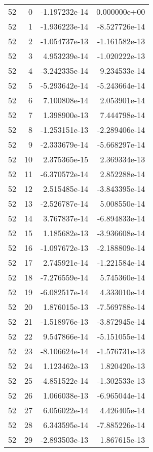 \begin{tabular}{rrrr}
  52 &    0 & -1.197232e-14 &  0.000000e+00 \\
  52 &    1 & -1.936223e-14 & -8.527726e-14 \\
  52 &    2 & -1.054737e-13 & -1.161582e-13 \\
  52 &    3 &  4.953239e-14 & -1.020222e-13 \\
  52 &    4 & -3.242335e-14 &  9.234533e-14 \\
  52 &    5 & -5.293642e-14 & -5.243664e-14 \\
  52 &    6 &  7.100808e-14 &  2.053901e-14 \\
  52 &    7 &  1.398900e-13 &  7.444798e-14 \\
  52 &    8 & -1.253151e-13 & -2.289406e-14 \\
  52 &    9 & -2.333679e-14 & -5.668297e-14 \\
  52 &   10 &  2.375365e-15 &  2.369334e-13 \\
  52 &   11 & -6.370572e-14 &  2.852288e-14 \\
  52 &   12 &  2.515485e-14 & -3.843395e-14 \\
  52 &   13 & -2.526787e-14 &  5.008550e-14 \\
  52 &   14 &  3.767837e-14 & -6.894833e-14 \\
  52 &   15 &  1.185682e-13 & -3.936608e-14 \\
  52 &   16 & -1.097672e-13 & -2.188809e-14 \\
  52 &   17 &  2.745921e-14 & -1.221584e-14 \\
  52 &   18 & -7.276559e-14 &  5.745360e-14 \\
  52 &   19 & -6.082517e-14 &  4.333010e-14 \\
  52 &   20 &  1.876015e-13 & -7.569788e-14 \\
  52 &   21 & -1.518976e-13 & -3.872945e-14 \\
  52 &   22 &  9.547866e-14 & -5.151055e-14 \\
  52 &   23 & -8.106624e-14 & -1.576731e-13 \\
  52 &   24 &  1.123462e-13 &  1.820420e-13 \\
  52 &   25 & -4.851522e-14 & -1.302533e-13 \\
  52 &   26 &  1.066038e-13 & -6.965044e-14 \\
  52 &   27 &  6.056022e-14 &  4.426405e-14 \\
  52 &   28 &  6.343595e-14 & -7.885226e-14 \\
  52 &   29 & -2.893503e-13 &  1.867615e-13 \\

\end{tabular}
